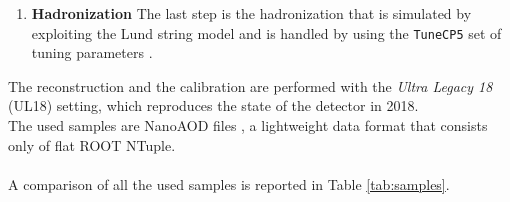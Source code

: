 \begin{enumerate}
    \item \textbf{Hadronization} The last step is the hadronization that is simulated by exploiting the Lund string model \cite{Andersson1983PartonDynamics} and is handled by \PYTHIA using the \texttt{TuneCP5} set of tuning parameters \cite{Sirunyan2020ExtractionMeasurements}.\\
\end{enumerate}

The reconstruction and the calibration are performed with the \textit{Ultra Legacy 18} (UL18) setting, which reproduces the state of the detector in 2018.\\
The used samples are NanoAOD files \cite{Liu2020TheCMS}, a lightweight data format that consists only of flat ROOT NTuple.
\\
\\
A comparison of all the used samples is reported in Table \ref{tab:samples}.
